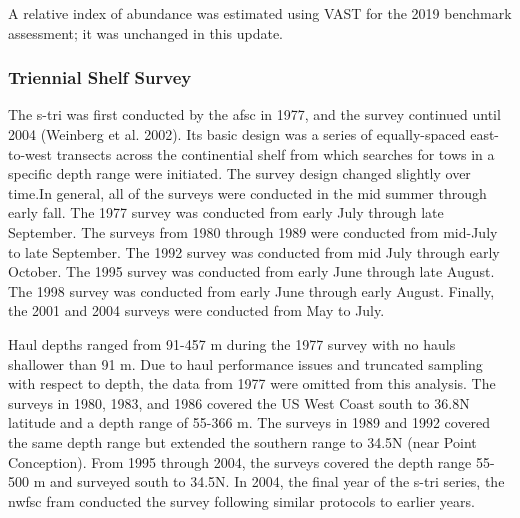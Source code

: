 \documentclass[11pt,
  english,
  a4paper,
]{article}
\begin{document}
\leavevmode\tagmcend\tagstructend\par


A relative index of abundance was estimated using VAST for the 2019 benchmark assessment; it was unchanged in this update.

\leavevmode\tagmcend\tagstructend\par


\hypertarget{triennial-shelf-survey}{%
\subsubsection{Triennial Shelf Survey}\label{triennial-shelf-survey}}

\leavevmode\tagmcend\tagstructend


The \gls{s-tri} was first conducted by the \gls{afsc} in 1977, and the survey continued until 2004 {(Weinberg et al. 2002)\leavevmode\tagmcend\tagstructend}. Its basic design was a series of equally-spaced east-to-west transects across the continential shelf from which searches for tows in a specific depth range were initiated. The survey design changed slightly over time.In general, all of the surveys were conducted in the mid summer through early fall. The 1977 survey was conducted from early July through late September. The surveys from 1980 through 1989 were conducted from mid-July to late September. The 1992 survey was conducted from mid July through early October. The 1995 survey was conducted from early June through late August. The 1998 survey was conducted from early June through early August. Finally, the 2001 and 2004 surveys were conducted from May to July.

\leavevmode\tagmcend\tagstructend\par


Haul depths ranged from 91-457 m during the 1977 survey with no hauls shallower than 91 m. Due to haul performance issues and truncated sampling with respect to depth, the data from 1977 were omitted from this analysis. The surveys in 1980, 1983, and 1986 covered the US West Coast south to 36.8\textdegree N latitude and a depth range of 55-366 m. The surveys in 1989 and 1992 covered the same depth range but extended the southern range to 34.5\textdegree N (near Point Conception). From 1995 through 2004, the surveys covered the depth range 55-500 m and surveyed south to 34.5\textdegree N. In 2004, the final year of the \gls{s-tri} series, the \gls{nwfsc} \gls{fram} conducted the survey following similar protocols to earlier years.
\end{document}
